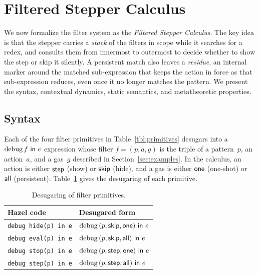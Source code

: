 \section{Filtered Stepper Calculus}\label{sec:filter}

We now formalize the filter system as the \emph{Filtered Stepper
Calculus}. The key idea is that the stepper carries a \emph{stack} of
the filters in scope while it searches for a redex, and consults them
from innermost to outermost to decide whether to show the step or skip
it silently. A persistent match also leaves a \emph{residue}, an internal marker
around the matched sub-expression that keeps the action in force as
that sub-expression reduces, even once it no longer matches the
pattern. We present the syntax,
contextual dynamics, static semantics, and metatheoretic properties.

\subsection{Syntax}

Each of the four filter primitives in Table~\ref{tbl:primitives}
desugars into a \(\operatorname{debug}{} f~\mathsf{in}~e\) expression whose filter
\(f = (p, a, g)\) is the triple of a pattern~\(p\), an action~\(a\),
and a gas~\(g\) described in Section~\ref{sec:examples}. In the calculus, an action is
either \(\mathsf{step}\) (show) or \(\mathsf{skip}\) (hide), and a gas is either
\(\mathsf{one}\) (one-shot) or \(\mathsf{all}\) (persistent).
Table~\ref{tbl:filter-syntax-sugar} gives the desugaring of each
primitive.

\begin{table}[htpb]
  \centering
  \caption{Desugaring of filter primitives.}\label{tbl:filter-syntax-sugar}
  \setlength{\tabcolsep}{8pt}
  \renewcommand{\arraystretch}{1.3}
  \begin{tabular}{ll}
    \toprule
    \textbf{Hazel code} & \textbf{Desugared form} \\
    \midrule
    \verb|debug hide(p) in e| & \(\operatorname{debug}{} (p, \mathsf{skip}, \mathsf{one})~\mathsf{in}~e\) \\
    \verb|debug eval(p) in e| & \(\operatorname{debug}{} (p, \mathsf{skip}, \mathsf{all})~\mathsf{in}~e\) \\
    \verb|debug stop(p) in e| & \(\operatorname{debug}{} (p, \mathsf{step}, \mathsf{one})~\mathsf{in}~e\) \\
    \verb|debug step(p) in e| & \(\operatorname{debug}{} (p, \mathsf{step}, \mathsf{all})~\mathsf{in}~e\) \\
    \bottomrule
  \end{tabular}
\end{table}

